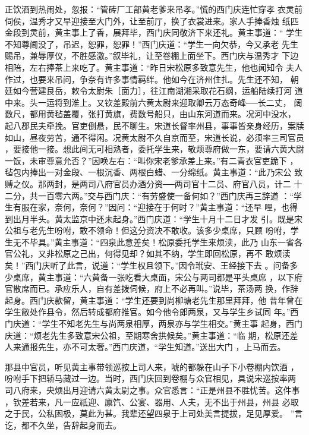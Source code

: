正饮酒到热闹处，忽报：“管砖厂工部黄老爹来吊孝。”慌的西门庆连忙穿孝
衣灵前伺侯，温秀才又早迎接至大门外，让至前厅，换了衣裳进来。家人手捧香烛
纸匹金段到灵前，黄主事上了香，展拜毕，西门庆同敬济下来还礼。黄主事道：“
学生不知尊阃没了，吊迟，恕罪，恕罪！”西门庆道：“学生一向欠恭，今又承老
先生赐吊，兼辱厚仪，不胜感激。”叙毕礼，让至卷棚上面坐下。西门庆与温秀才
下边相陪，左右捧茶上来吃了。黄主事道：“昨日宋松原多致意先生，他也闻知令
夫人作过，也要来吊问，争奈有许多事情羁绊。他如今在济州住扎。先生还不知，
朝廷如今营建艮岳，敕令太尉朱［面力］，往江南湖湘采取花石纲，运船陆续打河
道中来。头一运将到淮上。又钦差殿前六黄太尉来迎取卿云万态奇峰──长二丈，
阔数尺，都用黄毡盖覆，张打黄旗，费数号船只，由山东河道而来。况河中没水，
起八郡民夫牵挽。官吏倒悬，民不聊生。宋道长督率州县，事事皆亲身经历，案牍
如山，昼夜劳苦，通不得闲。况黄太尉不久自京而至，宋道长说，必须率三司官员
，要接他一接。想此间无可相熟者，委托学生来，敬烦尊府做一东，要请六黄大尉
一饭，未审尊意允否？”因唤左右：“叫你宋老爹承差上来。”有二青衣官吏跪下
，毡包内捧出一对金段、一根沉香、两根白蜡、一分绵纸。黄主事道：“此乃宋公
致赙之仪。那两封，是两司八府官员办酒分资──两司官十二员、府官八员，计二
十二分，共一百零六两。”交与西门庆：“有劳盛使一备何如？”西门庆再三辞道
：“学生有服在家，奈何，奈何？”因问：“迎接在于何时？”黄主事道：“还早
哩，也得到出月半头。黄太监京中还未起身。”西门庆道：“学生十月十二日才发
引。既是宋公祖与老先生吩咐，敢不领命！但这分资决不敢收。该多少桌席，只顾
吩咐，学生无不毕具。”黄主事道：“四泉此意差矣！松原委托学生来烦渎，此乃
山东一省各官公礼，又非松原之己出，何得见却？如其不纳，学生即回松原，再不
敢烦渎矣！”西门庆听了此言，说道：“学生权且领下。”因令玳安、王经接下去
。问备多少桌席，黄主事道：“六黄备一张吃看大桌面，宋公与两司都是平头桌席
，以下府官散席而已。承应乐人，自有差拨伺候，府上不必再叫。”说毕，茶汤两
换，作辞起身。西门庆款留，黄主事道：“学生还要到尚柳塘老先生那里拜拜，他
昔年曾在学生敝处作县令，然后转成都府推官。如今他令郎两泉，又与学生乡试同
年。”西门庆道：“学生不知老先生与尚两泉相厚，两泉亦与学生相交。”黄主事
起身，西门庆道：“烦老先生多致意宋公祖，至期寒舍拱候矣。”黄主事道：“临
期，松原还差人来通报先生，亦不可太奢。”西门庆道，“学生知道。”送出大门
，上马而去。

那县中官员，听见黄主事带领巡按上司人来，唬的都躲在山子下小卷棚内饮酒
，吩咐手下把轿马藏过一边。当时，西门庆回到卷棚与众官相见，具说宋巡按率两
司八府来，央烦出月迎请六黄太尉之事。众官悉言：“正是州县不胜忧苦。这件事
，钦差若来，凡一应祇迎、廪饩、公宴、器用、人夫，无不出于州县，州县
必取之于民，公私困极，莫此为甚。我辈还望四泉于上司处美言提拔，足见厚爱。
”言讫，都不久坐，告辞起身而去。

